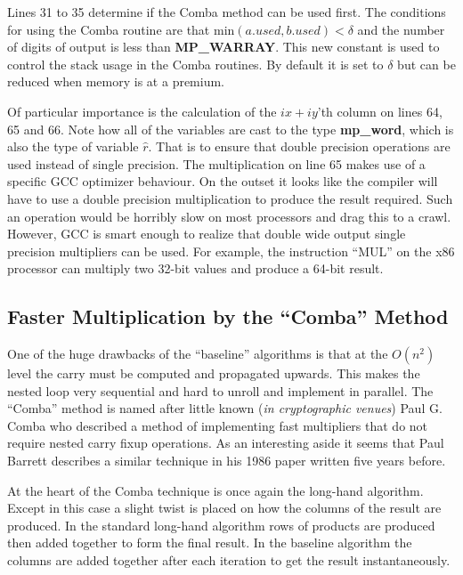 \documentclass[b5paper]{book}
\begin{document}
Lines 31 to 35 determine if the Comba method can be used first.  The conditions for using the Comba routine are that min$(a.used, b.used) < \delta$ and
the number of digits of output is less than \textbf{MP\_WARRAY}.  This new constant is used to control 
the stack usage in the Comba routines.  By default it is set to $\delta$ but can be reduced when memory is at a premium.

Of particular importance is the calculation of the $ix+iy$'th column on lines 64, 65 and 66.  Note how all of the
variables are cast to the type \textbf{mp\_word}, which is also the type of variable $\hat r$.  That is to ensure that double precision operations 
are used instead of single precision.  The multiplication on line 65 makes use of a specific GCC optimizer behaviour.  On the outset it looks like 
the compiler will have to use a double precision multiplication to produce the result required.  Such an operation would be horribly slow on most 
processors and drag this to a crawl.  However, GCC is smart enough to realize that double wide output single precision multipliers can be used.  For 
example, the instruction ``MUL'' on the x86 processor can multiply two 32-bit values and produce a 64-bit result.  

\subsection{Faster Multiplication by the ``Comba'' Method}

One of the huge drawbacks of the ``baseline'' algorithms is that at the $O(n^2)$ level the carry must be computed and propagated upwards.  This
makes the nested loop very sequential and hard to unroll and implement in parallel.  The ``Comba'' \cite{COMBA} method is named after little known 
(\textit{in cryptographic venues}) Paul G. Comba who described a method of implementing fast multipliers that do not require nested 
carry fixup operations.  As an interesting aside it seems that Paul Barrett describes a similar technique in
his 1986 paper \cite{BARRETT} written five years before.

At the heart of the Comba technique is once again the long-hand algorithm.  Except in this case a slight twist is placed on how
the columns of the result are produced.  In the standard long-hand algorithm rows of products are produced then added together to form the 
final result.  In the baseline algorithm the columns are added together after each iteration to get the result instantaneously.  
\end{document}
